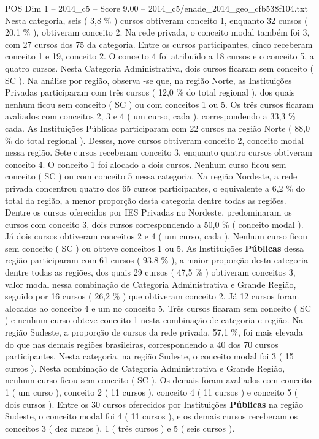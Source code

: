 \begin{textsample}{POS Dim 1 – 2014\_c5 – Score 9.00 – 2014\_c5/enade\_2014\_geo\_cfb538f104.txt}
Nesta categoria, seis ( 3,8 \% ) cursos obtiveram conceito 1, enquanto 32 cursos ( 20,1 \% ), obtiveram conceito 2.
Na rede privada, o conceito modal também foi 3, com 27 cursos dos 75 da categoria.
Entre os cursos participantes, cinco receberam conceito 1 e 19, conceito 2.
O conceito 4 foi atribuído a 18 cursos e o conceito 5, a quatro cursos.
Nesta Categoria Administrativa, dois cursos ficaram sem conceito ( SC ).
Na análise por região, observa -se que, na região Norte, as Instituições Privadas participaram com três cursos ( 12,0 \% do total regional ), dos quais nenhum ficou sem conceito ( SC ) ou com conceitos 1 ou 5.
Os três cursos ficaram avaliados com conceitos 2, 3 e 4 ( um curso, cada ), correspondendo a 33,3 \% cada.
As Instituições Públicas participaram com 22 cursos na região Norte ( 88,0 \% do total regional ).
Desses, nove cursos obtiveram conceito 2, conceito modal nessa região.
Sete cursos receberam conceito 3, enquanto quatro cursos obtiveram conceito 4.
O conceito 1 foi alocado a dois cursos.
Nenhum curso ficou sem conceito ( SC ) ou com conceito 5 nessa categoria.
Na região Nordeste, a rede privada concentrou quatro dos 65 cursos participantes, o equivalente a 6,2 \% do total da região, a menor proporção desta categoria dentre todas as regiões.
Dentre os cursos oferecidos por IES Privadas no Nordeste, predominaram os cursos com conceito 3, dois cursos correspondendo a 50,0 \% ( conceito modal ).
Já dois cursos obtiveram conceitos 2 e 4 ( um curso, cada ).
Nenhum curso ficou sem conceito ( SC ) ou obteve conceitos 1 ou 5.
As Instituições \textbf{Públicas} dessa região participaram com 61 cursos ( 93,8 \% ), a maior proporção desta categoria dentre todas as regiões, dos quais 29 cursos ( 47,5 \% ) obtiveram conceitos 3, valor modal nessa combinação de Categoria Administrativa e Grande Região, seguido por 16 cursos ( 26,2 \% ) que obtiveram conceito 2.
Já 12 cursos foram alocados ao conceito 4 e um no conceito 5.
Três cursos ficaram sem conceito ( SC ) e nenhum curso obteve conceito 1 nesta combinação de categoria e região.
Na região Sudeste, a proporção de cursos da rede privada, 57,1 \%, foi mais elevada do que nas demais regiões brasileiras, correspondendo a 40 dos 70 cursos participantes.
Nesta categoria, na região Sudeste, o conceito modal foi 3 ( 15 cursos ).
Nesta combinação de Categoria Administrativa e Grande Região, nenhum curso ficou sem conceito ( SC ).
Os demais foram avaliados com conceito 1 ( um curso ), conceito 2 ( 11 cursos ), conceito 4 ( 11 cursos ) e conceito 5 ( dois cursos ).
Entre os 30 cursos oferecidos por Instituições \textbf{Públicas} na região Sudeste, o conceito modal foi 4 ( 11 cursos ), e os demais cursos receberam os conceitos 3 ( dez cursos ), 1 ( três cursos ) e 5 ( seis cursos ).

\end{textsample}
